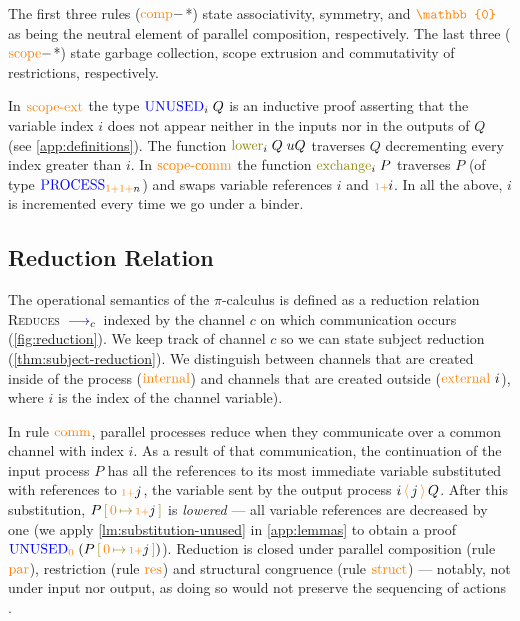 \documentclass[sigplan,10pt,anonymous,review]{acmart}
\theoremstyle{definition}
\newcommand{\picalc}{$\pi$-calculus}
\newcommand{\type}[1]{\textcolor{blue}{\operatorname{#1}}}
\newcommand{\constr}[1]{\textcolor{orange}{\operatorname{#1}}}
\newcommand{\func}[1]{\textcolor{olive}{\operatorname{#1}}}
\newcommand{\PO}{\constr{\mathbb{0}}}
\newcommand{\send}[2]{#1 \, \constr{\langle} \, #2 \,\constr{\rangle} \,}
\newcommand{\suc}{\constr{\scriptstyle 1+}}
\newcommand{\subst}[3]{#1 \, \func{[} \, #3 \, \func{\mapsto} \,#2 \, \func{]}}
\newcommand{\reduce}[1]{\, \type{\longrightarrow}_{#1} \,}
\newcommand{\Process}{\type{PROCESS}}
\newcommand{\Unused}{\type{UNUSED}}
\begin{document}
The first three rules ($\constr{comp}-$*) state associativity, symmetry, and $\PO$ as being the neutral element of parallel composition, respectively.
The last three ($\constr{scope}-$*) state garbage collection, scope extrusion and commutativity of restrictions, respectively.

In $\constr{scope-ext}$ the type $\Unused_i \; Q$ is an inductive proof asserting that the variable index $i$ does not appear neither in the inputs nor in the outputs of $Q$ (see \autoref{app:definitions}).
The function $\func{lower}_i \; Q \; uQ$ traverses $Q$ decrementing every index greater than $i$.
In $\constr{scope-comm}$ the function $\func{exchange}_i \; P$ traverses $P$ (of type $\allowbreak \Process_{\suc \suc n}$) and swaps variable references $i$ and $\suc i$.
In all the above, $i$ is incremented every time we go under a binder.
  
\subsection{Reduction Relation}
\label{operational-semantics}

The operational semantics of the \picalc{} is defined as a reduction relation \textsc{Reduces} $\reduce{c}$ indexed by the channel $c$ on which communication occurs (\autoref{fig:reduction}).
We keep track of channel $c$ so we can state subject reduction (\autoref{thm:subject-reduction}).
We distinguish between channels that are created inside of the process ($\constr{internal}$) and channels that are created outside ($\constr{external}\ i$), where $i$ is the index of the channel variable).

In rule $\constr{comm}$, parallel processes reduce when they communicate over a common channel with index ${i}$.
As a result of that communication, the continuation of the input process $P$ has all the references to its most immediate variable substituted with references to $\suc j$, the variable sent by the output process $\send{i}{j}{Q}$.
After this substitution, $\subst{P}{\suc j}{\constr{0}}$ is \emph{lowered} --- all variable references are decreased by one (we apply \autoref{lm:substitution-unused} in \autoref{app:lemmas} to obtain a proof $\Unused_{\constr{0}} \; (\subst{P}{\suc j}{\constr{0}})$).
Reduction is closed under parallel composition (rule $\constr{par}$), restriction (rule $\constr{res}$) and structural congruence (rule $\constr{struct}$) 
--- notably, not under input nor output, as doing so would not preserve the sequencing of actions \cite{Sangio01}.
\end{document}

